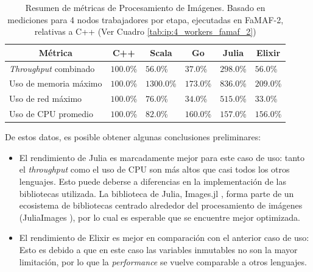 \documentclass[11pt]{article}
\newcommand{\english}[1]{\textit{#1}}
\begin{document}
\begin{table}[h]
\centering
\begin{tabular}{|l|l|l|l|l|l|}
\hline
\multicolumn{1}{|c|}{Métrica} & \multicolumn{1}{c|}{C++} & \multicolumn{1}{c|}{Scala} & \multicolumn{1}{c|}{Go} & \multicolumn{1}{c|}{Julia} & \multicolumn{1}{c|}{Elixir} \\ \hline
\english{Throughput} combinado           & $100.0$\%                    & $56.0$\%                       & $37.0$\%                    & $298.0$\%                      & $56.0$\%                        \\ \hline
Uso de memoria máximo              & $100.0$\%                    & $1300.0$\%                     & $173.0$\%                   & $836.0$\%                      & $209.0$\%                       \\ \hline
Uso de red máximo             & $100.0$\%                    & $76.0$\%                       & $34.0$\%                    & $515.0$\%                      & $33.0$\%                        \\ \hline
Uso de CPU promedio                 & $100.0$\%                    & $82.0$\%                       & $160.0$\%                   & $157.0$\%                      & $156.0$\%                       \\ \hline
\end{tabular}
\caption{Resumen de métricas de Procesamiento de Imágenes. Basado en mediciones para 4 nodos trabajadores por etapa, ejecutadas en FaMAF-2, relativas a C++ (Ver Cuadro \ref{tab:ip:4_workers_famaf_2})}
\label{tab:sis_dist:ip_metrics}
\end{table}

De estos datos, es posible obtener algunas conclusiones preliminares:

\begin{itemize}
    \item El rendimiento de Julia es marcadamente mejor para este caso de uso: tanto el \english{throughput} como el uso de CPU son más altos que casi todos los otros lenguajes. Esto puede deberse a diferencias en la implementación de las bibliotecas utilizada. La biblioteca de Julia, Images.jl \cite{jl:lib:images}, forma parte de un ecosistema de bibliotecas centrado alrededor del procesamiento de imágenes (JuliaImages \cite{jl:lib:juliaimages}), por lo cual es esperable que se encuentre mejor optimizada.
    \item El rendimiento de Elixir es mejor en comparación con el anterior caso de uso: Esto es debido a que en este caso las variables inmutables no son la mayor limitación, por lo que la \english{performance} se vuelve comparable a otros lenguajes.
\end{itemize}
\end{document}
